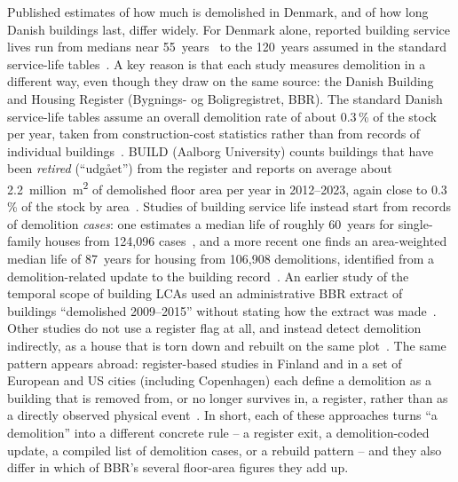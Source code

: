 Published estimates of how much is demolished in Denmark, and of how long
Danish buildings last, differ widely. For Denmark alone, reported building
service lives run from medians near 55~years~\cite{ostergaard2018temporal}
to the 120~years assumed in the standard service-life
tables~\cite{aagaard2013levetider}. A key reason is that each study measures
demolition in a different way, even though they draw on the same source: the
Danish Building and Housing Register (Bygnings- og Boligregistret, BBR). The standard Danish service-life tables assume an
overall demolition rate of about 0.3\,\% of the stock per year, taken from
construction-cost statistics rather than from records of individual
buildings~\cite{aagaard2013levetider}. BUILD (Aalborg University) counts
buildings that have been \emph{retired} (``udg{\aa}et'') from the register
and reports on average about 2.2~million~m\textsuperscript{2} of demolished
floor area per year in 2012--2023, again close to 0.3\,\% of the stock by
area~\cite{jensen2025nedrivning}. Studies of building service life instead
start from records of demolition \emph{cases}: one estimates a median life
of roughly 60~years for single-family houses from 124{,}096
cases~\cite{andersen2023lifespan}, and a more recent one finds an
area-weighted median life of 87~years for housing from 106{,}908
demolitions, identified from a demolition-related update to the building
record~\cite{droob2026servicelife}. An earlier study of the temporal scope
of building LCAs used an administrative BBR extract of buildings
``demolished 2009--2015'' without stating how the extract was
made~\cite{ostergaard2018temporal}. Other studies do not use a register
flag at all, and instead detect demolition indirectly, as a house that is
torn down and rebuilt on the same
plot~\cite{jensen2022enfamiliehuse,blv2023karakteristika}. The same pattern
appears abroad: register-based studies in Finland and in a set of European
and US cities (including Copenhagen) each define a demolition as a building
that is removed from, or no longer survives in, a register, rather than as
a directly observed physical event~\cite{huuhka2021stocks,berglundbrown2025lifetimes}.
In short, each of these approaches turns ``a demolition'' into a different
concrete rule -- a register exit, a demolition-coded update, a compiled list
of demolition cases, or a rebuild pattern -- and they also differ in which
of BBR's several floor-area figures they add up.

